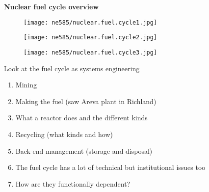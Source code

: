 \documentclass[aspectratio=1610,pdftex,dvipsnames,compress,xcolor={dvipsnames}]{beamer}
\begin{document}
\begin{frame}[plain]{}
    \centering\LARGE\textbf{Nuclear fuel cycle overview}
\end{frame}


\addtocounter{framenumber}{-1} 
\begin{frame}{}
    \begin{figure}
        \centering
        \texttt{[image: ne585/nuclear.fuel.cycle1.jpg]}
    \end{figure}
\end{frame}


\begin{frame}{}
    \begin{figure}
        \centering
        \texttt{[image: ne585/nuclear.fuel.cycle2.jpg]}
    \end{figure}
\end{frame}

\begin{frame}{}
    \begin{figure}
        \centering
        \texttt{[image: ne585/nuclear.fuel.cycle3.jpg]}
    \end{figure}
\end{frame}


\begin{frame}{Look at the fuel cycle as systems engineering}
    \begin{enumerate}[series=outerlist,topsep=0pt,itemsep=21pt,leftmargin=*,label=(\arabic*)]
        \item[]Mining
        \item[]Making the fuel (saw Areva plant in Richland)
        \item[]What a reactor does and the different kinds
        \item[]Recycling (what kinds and how)
        \item[]Back-end management (storage and disposal)
        \item[]The fuel cycle has a lot of technical but institutional issues too
        \item[]How are they functionally dependent? 
    \end{enumerate}
\end{frame}
\end{document}
